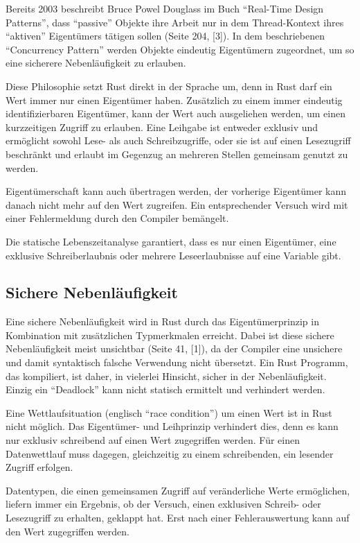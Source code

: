 \begin{multicols}{2}
Bereits 2003 beschreibt Bruce Powel Douglass im Buch \enquote{Real-Time Design Patterns}, dass \enquote{passive} Objekte ihre Arbeit nur in dem Thread-Kontext ihres \enquote{aktiven} Eigentümers tätigen sollen (Seite 204, [3]).
In dem beschriebenen \enquote{Concurrency Pattern} werden Objekte eindeutig Eigentümern zugeordnet, um so eine sicherere Nebenläufigkeit zu erlauben.

Diese Philosophie setzt Rust direkt in der Sprache um, denn in Rust darf ein Wert immer nur einen Eigentümer haben.
Zusätzlich zu einem immer eindeutig identifizierbaren Eigentümer, kann der Wert auch ausgeliehen werden, um einen kurzzeitigen Zugriff zu erlauben.
Eine Leihgabe ist entweder exklusiv und ermöglicht sowohl Lese- als auch Schreibzugriffe, oder sie ist auf einen Lesezugriff beschränkt und erlaubt im Gegenzug an mehreren Stellen gemeinsam genutzt zu werden.

Eigentümerschaft kann auch übertragen werden, der vorherige Eigentümer kann danach nicht mehr auf den Wert zugreifen.
Ein entsprechender Versuch wird mit einer Fehlermeldung durch den Compiler bemängelt.

Die statische Lebenszeitanalyse garantiert, dass es nur einen Eigentümer, eine exklusive Schreiberlaubnis oder mehrere Leseerlaubnisse auf eine Variable gibt.

\subsection*{Sichere Nebenläufigkeit}

Eine sichere Nebenläufigkeit wird in Rust durch das Eigentümerprinzip in Kombination mit zusätzlichen Typmerkmalen erreicht.
Dabei ist diese sichere Nebenläufigkeit meist unsichtbar (Seite 41, [1]), da der Compiler eine unsichere und damit syntaktisch falsche Verwendung nicht übersetzt.
Ein Rust Programm, das kompiliert, ist daher, in vielerlei Hinsicht, sicher in der Nebenläufigkeit.
Einzig ein \enquote{Deadlock} kann nicht statisch ermittelt und verhindert werden.

Eine Wettlaufsituation (englisch \enquote{race condition}) um einen Wert ist in Rust nicht möglich.
Das Eigentümer- und Leihprinzip verhindert dies, denn es kann nur exklusiv schreibend auf einen Wert zugegriffen werden.
Für einen Datenwettlauf muss dagegen, gleichzeitig zu einem schreibenden, ein lesender Zugriff erfolgen.

Datentypen, die einen gemeinsamen Zugriff auf veränderliche Werte ermöglichen, liefern immer ein Ergebnis, ob der Versuch, einen exklusiven Schreib- oder Lesezugriff zu erhalten, geklappt hat.
Erst nach einer Fehlerauswertung kann auf den Wert zugegriffen werden.


\end{multicols}
